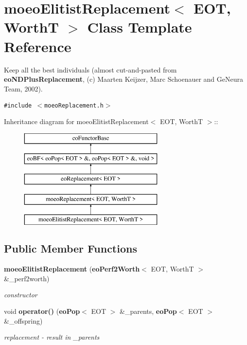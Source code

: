 \section{moeo\-Elitist\-Replacement$<$ EOT, Worth\-T $>$ Class Template Reference}
\label{classmoeoElitistReplacement}
Keep all the best individuals (almost cut-and-pasted from {\bf eo\-NDPlus\-Replacement}, (c) Maarten Keijzer, Marc Schoenauer and Ge\-Neura Team, 2002).  


{\tt \#include $<$moeo\-Replacement.h$>$}

Inheritance diagram for moeo\-Elitist\-Replacement$<$ EOT, Worth\-T $>$::\begin{figure}[H]
\begin{center}
\leavevmode
\includegraphics[height=5cm]{classmoeoElitistReplacement}
\end{center}
\end{figure}
\subsection*{Public Member Functions}
\begin{CompactItemize}
\item 
{\bf moeo\-Elitist\-Replacement} ({\bf eo\-Perf2Worth}$<$ EOT, Worth\-T $>$ \&\_\-perf2worth)
\begin{CompactList}\small\item\em constructor \item\end{CompactList}\item 
void {\bf operator()} ({\bf eo\-Pop}$<$ EOT $>$ \&\_\-parents, {\bf eo\-Pop}$<$ EOT $>$ \&\_\-offspring)
\begin{CompactList}\small\item\em replacement - result in \_\-parents \item\end{CompactList}\end{CompactItemize}
